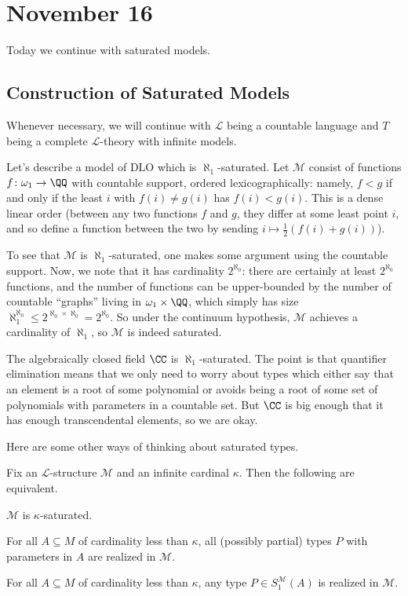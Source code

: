 \documentclass[../notes.tex]{subfiles}
\begin{document}
\section{November 16}

Today we continue with saturated models.

\subsection{Construction of Saturated Models}
Whenever necessary, we will continue with $\mathcal L$ being a countable language and $T$ being a complete $\mathcal L$-theory with infinite models.
\begin{example}
	Let's describe a model of $\mathrm{DLO}$ which is $\aleph_1$-saturated. Let $\mathcal M$ consist of functions $f\colon\omega_1\to\QQ$ with countable support, ordered lexicographically: namely, $f<g$ if and only if the least $i$ with $f(i)\ne g(i)$ has $f(i)<g(i)$. This is a dense linear order (between any two functions $f$ and $g$, they differ at some least point $i$, and so define a function between the two by sending $i\mapsto\frac12(f(i)+g(i))$).

	To see that $\mathcal M$ is $\aleph_1$-saturated, one makes some argument using the countable support. Now, we note that it has cardinality $2^{\aleph_0}$: there are certainly at least $2^{\aleph_0}$ functions, and the number of functions can be upper-bounded by the number of countable ``graphs'' living in $\omega_1\times\QQ$, which simply has size $\aleph_1^{\aleph_0}\le2^{\aleph_0\times\aleph_0}=2^{\aleph_0}$. So under the continuum hypothesis, $\mathcal M$ achieves a cardinality of $\aleph_1$, so $\mathcal M$ is indeed saturated.
\end{example}
\begin{example}
	The algebraically closed field $\CC$ is $\aleph_1$-saturated. The point is that quantifier elimination means that we only need to worry about types which either say that an element is a root of some polynomial or avoids being a root of some set of polynomials with parameters in a countable set. But $\CC$ is big enough that it has enough transcendental elements, so we are okay.
\end{example}
Here are some other ways of thinking about saturated types.
\begin{proposition}
	Fix an $\mathcal L$-structure $\mathcal M$ and an infinite cardinal $\kappa$. Then the following are equivalent.
	\begin{listalph}
		\item $\mathcal M$ is $\kappa$-saturated.
		\item For all $A\subseteq M$ of cardinality less than $\kappa$, all (possibly partial) types $P$ with parameters in $A$ are realized in $\mathcal M$.
		\item For all $A\subseteq M$ of cardinality less than $\kappa$, any type $P\in S_1^\mathcal M(A)$ is realized in $\mathcal M$.
	\end{listalph}
\end{proposition}
\end{document}
